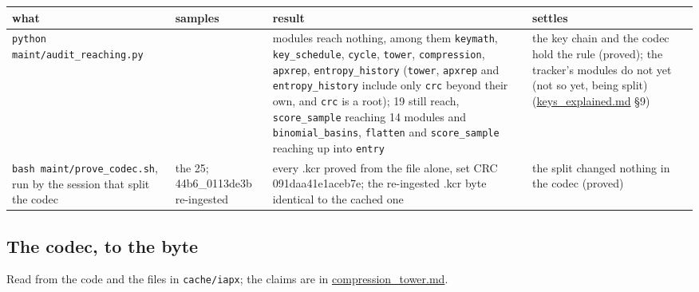 {\footnotesize
\setlength{\tabcolsep}{6pt}
\begin{longtable}{>{\RaggedRight\arraybackslash}p{}>{\RaggedRight\arraybackslash}p{}>{\RaggedRight\arraybackslash}p{}>{\RaggedRight\arraybackslash}p{}}
\toprule
what & samples & result & settles \\
\midrule
\endhead
\texttt{python maint/\allowbreak{}audit\_\allowbreak{}reaching.\allowbreak{}py} &  & 18 modules reach nothing, among them \texttt{keymath}, \texttt{key\_\allowbreak{}schedule}, \texttt{cycle}, \texttt{tower}, \texttt{compression}, \texttt{apxrep}, \texttt{entropy\_\allowbreak{}history} (\texttt{tower}, \texttt{apxrep} and \texttt{entropy\_\allowbreak{}history} include only \texttt{crc} beyond their own, and \texttt{crc} is a root); 19 still reach, \texttt{score\_\allowbreak{}sample} reaching 14 modules and \texttt{binomial\_\allowbreak{}basins}, \texttt{flatten} and \texttt{score\_\allowbreak{}sample} reaching up into \texttt{entry} & the key chain and the codec hold the rule (proved); the tracker's modules do not yet (not so yet, being split) (\hyperref[chap:keys-explained]{keys\_\allowbreak{}explained.md} §9) \\
\texttt{bash maint/\allowbreak{}prove\_\allowbreak{}codec.\allowbreak{}sh}, run by the session that split the codec & the 25; 44b6\_\allowbreak{}0113de3b re-ingested & every .kcr proved from the file alone, set CRC 091daa41e1aceb7e; the re-ingested .kcr byte identical to the cached one & the split changed nothing in the codec (proved) \\
\bottomrule
\end{longtable}
}

\subsection{\texorpdfstring{The codec, to the byte}{The codec, to the byte}}

Read from the code and the files in \texttt{cache/\allowbreak{}iapx}; the claims are in \hyperref[chap:compression-tower]{compression\_\allowbreak{}tower.md}.

